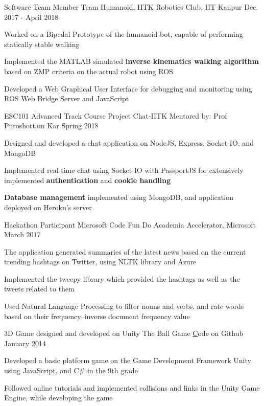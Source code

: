
\begin{cventries}

  \cventry
    {Software Team Member} 
    {Team Humanoid, IITK}
    {Robotics Club, IIT Kanpur}
    {Dec. 2017 - April 2018} 
    {
      \begin{cvitems} 
        \item {Worked on a Bipedal Prototype of the humanoid bot, capable of performing statically stable walking}
        \item {Implemented the MATLAB simulated \textbf{inverse kinematics walking algorithm} based on ZMP criteria on the actual robot using ROS}
        \item {Developed a Web Graphical User Interface for debugging and monitoring using ROS Web Bridge Server and JavaScript}
      \end{cvitems}
    }


  \cventry
    {ESC101 Advanced Track Course Project}
    {Chat-IITK}
    {Mentored by: Prof. Puroshottam Kar}
    {Spring 2018}
    {
      \begin{cvitems}
        \item {Designed and developed a chat application on NodeJS, Express, Socket-IO, and MongoDB}
        \item {Implemented real-time chat using Socket-IO with PassportJS for extensively implemented \textbf{authentication} and \textbf{cookie handling}}
        \item {\textbf{Database management} implemented using MongoDB, and application deployed on Heroku's server}
      \end{cvitems}
    }

  \cventry
    {Hackathon Participant}
    {Microsoft Code Fun Do} 
    {Academia Accelerator, Microsoft}
    {March 2017}
    {
      \begin{cvitems} 
        \item {The application generated summaries of the latest news based on the current trending hashtags on Twitter, using NLTK library and Azure}
        \item {Implemented the tweepy library which provided the hashtags as well as the tweets related to them}
        \item {Used Natural Language Processing to filter nouns and verbs, and rate words based on their frequency–inverse document frequency value}
      \end{cvitems}
    }

  \cventry
    {3D Game designed and developed on Unity} 
    {The Ball Game} 
    {\href{https://github.com/7ayushgupta/UnityGame}Code on Github}
    {January 2014}
    {
      \begin{cvitems}
        \item {Developed a basic platform game on the Game Development Framework Unity using JavaScript, and C\# in the 9th grade}
        \item {Followed online tutorials and implemented collisions and links in the Unity Game Engine, while developing the game}
      \end{cvitems}
    }

\end{cventries}
